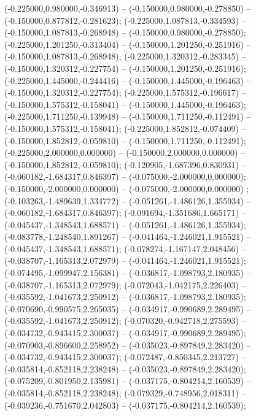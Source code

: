  (-0.225000,0.980000,-0.346913) -- (-0.150000,0.980000,-0.278850) -- (-0.150000,0.877812,-0.281623);
 (-0.225000,1.087813,-0.334593) -- (-0.150000,1.087813,-0.268948) -- (-0.150000,0.980000,-0.278850);
 (-0.225000,1.201250,-0.313404) -- (-0.150000,1.201250,-0.251916) -- (-0.150000,1.087813,-0.268948);
 (-0.225000,1.320312,-0.283345) -- (-0.150000,1.320312,-0.227754) -- (-0.150000,1.201250,-0.251916);
 (-0.225000,1.445000,-0.244416) -- (-0.150000,1.445000,-0.196463) -- (-0.150000,1.320312,-0.227754);
 (-0.225000,1.575312,-0.196617) -- (-0.150000,1.575312,-0.158041) -- (-0.150000,1.445000,-0.196463);
 (-0.225000,1.711250,-0.139948) -- (-0.150000,1.711250,-0.112491) -- (-0.150000,1.575312,-0.158041);
 (-0.225000,1.852812,-0.074409) -- (-0.150000,1.852812,-0.059810) -- (-0.150000,1.711250,-0.112491);
 (-0.225000,2.000000,0.000000) -- (-0.150000,2.000000,0.000000) -- (-0.150000,1.852812,-0.059810);
 (-0.120905,-1.687396,0.830931) -- (-0.060182,-1.684317,0.846397) -- (-0.075000,-2.000000,0.000000);
 (-0.150000,-2.000000,0.000000) -- (-0.075000,-2.000000,0.000000) ;
 (-0.103263,-1.489639,1.334772) -- (-0.051261,-1.486126,1.355934) -- (-0.060182,-1.684317,0.846397);
 (-0.091694,-1.351686,1.665171) -- (-0.045437,-1.348543,1.688571) -- (-0.051261,-1.486126,1.355934);
 (-0.083778,-1.248540,1.891267) -- (-0.041464,-1.246021,1.915521) -- (-0.045437,-1.348543,1.688571);
 (-0.078274,-1.167147,2.048456) -- (-0.038707,-1.165313,2.072979) -- (-0.041464,-1.246021,1.915521);
 (-0.074495,-1.099947,2.156381) -- (-0.036817,-1.098793,2.180935) -- (-0.038707,-1.165313,2.072979);
 (-0.072043,-1.042175,2.226403) -- (-0.035592,-1.041673,2.250912) -- (-0.036817,-1.098793,2.180935);
 (-0.070690,-0.990575,2.265035) -- (-0.034917,-0.990689,2.289495) -- (-0.035592,-1.041673,2.250912);
 (-0.070320,-0.942718,2.275593) -- (-0.034732,-0.943415,2.300037) -- (-0.034917,-0.990689,2.289495);
 (-0.070903,-0.896600,2.258952) -- (-0.035023,-0.897849,2.283420) -- (-0.034732,-0.943415,2.300037);
 (-0.072487,-0.850345,2.213727) -- (-0.035814,-0.852118,2.238248) -- (-0.035023,-0.897849,2.283420);
 (-0.075209,-0.801950,2.135981) -- (-0.037175,-0.804214,2.160539) -- (-0.035814,-0.852118,2.238248);
 (-0.079329,-0.748956,2.018311) -- (-0.039236,-0.751670,2.042803) -- (-0.037175,-0.804214,2.160539);
